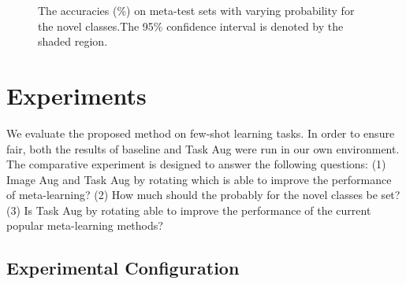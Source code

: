 \documentclass[10pt,twocolumn,letterpaper]{article}
\begin{document}
\begin{figure*}[t]
\begin{center}



\end{center}
   \caption{The accuracies (\%) on meta-test sets with varying probability  for the novel classes.The 95\% confidence interval is denoted by the shaded region.}
\label{Task_Aug_p}
\end{figure*}

\section{Experiments}\label{experiments}
We evaluate the proposed method on few-shot learning tasks. In order to ensure fair, both the results of baseline and Task Aug were run in our own environment. The comparative experiment is designed to answer the following questions: (1) Image Aug and Task Aug by rotating which is able to improve the performance of meta-learning? (2) How much should the probably for the novel classes be set? (3) Is Task Aug by rotating able to improve the performance of the current popular meta-learning methods?

\subsection{Experimental Configuration}
\end{document}
